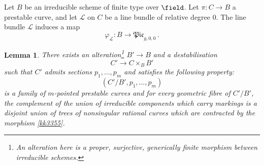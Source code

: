 \documentclass[a4paper,12pt]{article} %
\newcommand{\ca}[1]{{\mathcal{#1}}}
\theoremstyle{definition}
\theoremstyle{plain}%
\newtheorem{lemma}[definition]{Lemma}
\renewcommand{\phi}{\varphi}
\newcommand{\Picabs}{\mathfrak{Pic}}
\begin{document}
Let $B$ be an irreducible scheme of finite type over ${\field}$.
Let $\pi\colon C\to B$ a prestable curve, and let
$\ca L$ on $C$ be a line bundle 
of relative degree $0$. 
The line bundle $\ca L$ induces a map 
$$\phi_{\ca L} \colon B \to \Picabs_{g,0,0}\, .$$

 \begin{lemma} There exists an \label{ALTt}
 alteration{\footnote{An alteration here is a proper, surjective, generically finite morphism between irreducible schemes.}}
 $B' \to B$ and a destabilisation
 \begin{equation}\label{kk3355}
 C' \to C \times_B B'
 \end{equation}
 such that $C'$ admits sections $p_1, \ldots, p_m$ and satisfies the
 following property:
 $$(C'/B', p_1, \ldots, p_m)$$ is a family of $m$-pointed prestable curves 
 and 
 for every geometric fibre of $C'/B'$,  the
complement of the union of irreducible components which carry markings
is a disjoint union of trees of nonsingular
rational curves which are contracted by the morphism \eqref{kk3355}.

\end{lemma}
\end{document}
